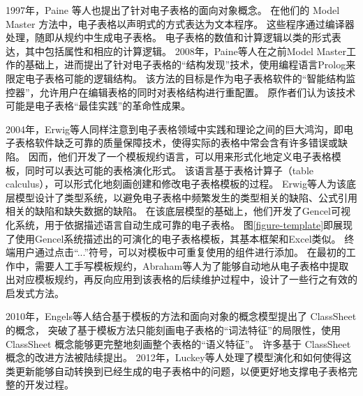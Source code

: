 1997年，Paine 等人\cite{ireson1997model,paine2008ensuring,paine2005bringing,paine2008rapid}也提出了针对电子表格的面向对象概念。
在他们的 Model Master 方法中，电子表格以声明式的方式表达为文本程序。
这些程序通过编译器处理，随即从规约中生成电子表格。
电子表格的数值和计算逻辑以类的形式表达，其中包括属性和相应的计算逻辑。
2008年，Paine等人\cite{paine2008spreadsheet}在之前Model Master工作的基础上，进而提出了针对电子表格的“结构发现”技术，使用编程语言Prolog来限定电子表格可能的逻辑结构。
该方法的目标是作为电子表格软件的“智能结构监控器”，允许用户在编辑表格的同时对表格结构进行重配置。
原作者们认为该技术可能是电子表格“最佳实践”的革命性成果。



2004年，Erwig等人\cite{erwig2004gencel,erwig2005automatic,abraham2005goal}同样注意到电子表格领域中实践和理论之间的巨大鸿沟，即电子表格软件缺乏可靠的质量保障技术，使得实际的表格中常会含有许多错误或缺陷。
因而，他们开发了一个模板规约语言，可以用来形式化地定义电子表格模板，同时可以表达可能的表格演化形式。
该语言基于表格计算子（table calculus），可以形式化地刻画创建和修改电子表格模板的过程。
Erwig等人为该底层模型设计了类型系统，以避免电子表格中频繁发生的类型相关的缺陷、公式引用相关的缺陷和缺失数据的缺陷。
在该底层模型的基础上，他们开发了Gencel可视化系统，用于依据描述语言自动生成可靠的电子表格。
图\ref{figure-template}即展现了使用Gencel系统描述出的可演化的电子表格模板，其基本框架和Excel类似。
终端用户通过点击“...”符号，可以对模板中可重复使用的组件进行添加。
在最初的工作中，需要人工手写模板规约，Abraham等人\cite{abraham2006inferring}为了能够自动地从电子表格中提取出对应模板规约，再反向应用到该表格的后续维护过程中，设计了一些行之有效的启发式方法。


2010年，Engels等人\cite{engels2005classsheets,cunha2010automatically}结合基于模板的方法和面向对象的概念模型提出了 ClassSheet 的概念，
突破了基于模板方法只能刻画电子表格的“词法特征”的局限性，使用 ClassSheet 概念能够更完整地刻画整个表格的“语义特征”。
许多基于 ClassSheet 概念的改进方法被陆续提出\cite{luckey2012systematic,cunha2011type,cunha2011embedding,cunha2012bidirectional}。
2012年，Luckey等人\cite{luckey2012systematic}处理了模型演化和如何使得这类更新能够自动转换到已经生成的电子表格中的问题，以便更好地支撑电子表格完整的开发过程。

